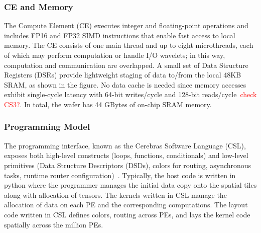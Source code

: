 \documentclass[sigconf]{acmart}
\begin{document}
\subsubsection{CE and Memory}
The Compute Element (CE) executes integer and floating-point operations and includes FP16 and FP32 SIMD instructions 
that enable fast access to local memory. The CE consists of one main thread and up to eight microthreads, each of which may perform computation or handle I/O wavelets; in this way, computation and communication are overlapped.
A small set of Data Structure Registers (DSRs) provide lightweight staging of data to/from the local 48KB SRAM, as shown in the figure. %
No data cache is needed since memory accesses exhibit %
single-cycle latency with 64-bit writes/cycle and 128-bit reads/cycle~\cite{luczynski_reduce}\textcolor{red}{check CS3?}. In total, the wafer has 44 GBytes of on-chip SRAM memory.  %


\subsubsection{Programming Model}
    The programming interface, known as the Cerebras Software Language (CSL), exposes both high-level constructs (loops, functions, conditionals) and low-level primitives (Data Structure Descriptors (DSDs), colors for routing, asynchronous tasks, runtime router configuration)~\cite{CSL}. Typically, %
    the host code is written in python where the programmer manages the initial data copy onto the spatial tiles along with allocation of tensors. The kernels written in CSL manage the allocation of data on each PE and the corresponding computations. The layout code written in CSL defines colors, routing across PEs, and lays the kernel code spatially across the million PEs.
    
\end{document}
